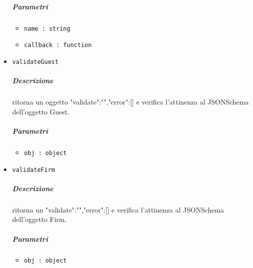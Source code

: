 \documentclass[../ManualeSviluppatore_v2.0.0.tex]{subfiles}
\begin{document}
\begin{itemize}
\subparagraph{Parametri} \begin{itemize}
\item \texttt{name : string}
\item \texttt{callback : function}
\end{itemize}
\item \texttt{validateGuest}
\subparagraph{Descrizione} ritorna un oggetto {"validate":"","error":[]} e verifica l'attinenza al JSONSchema dell'oggetto Guest.
\subparagraph{Parametri} \begin{itemize}
\item \texttt{obj : object}
\end{itemize}
\item \texttt{validateFirm}
\subparagraph{Descrizione} ritorna un {"validate":"","error":[]}  e verifica l'attinenza al JSONSchema dell'oggetto Firm.
\subparagraph{Parametri} \begin{itemize}
\item \texttt{obj : object}
\end{itemize}
\end{itemize}
\end{document}
